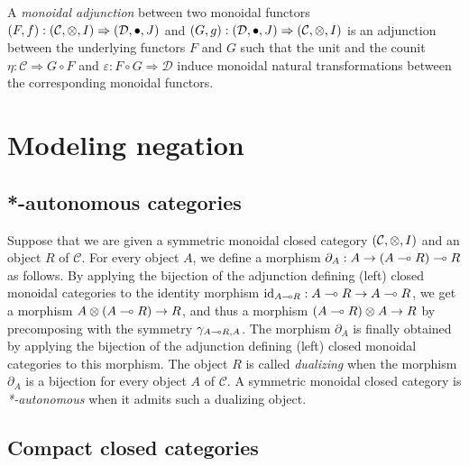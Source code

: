 \begin{definition}
A \emph{monoidal adjunction} between two monoidal functors
$(F,f):(\mathcal{C},\otimes,I)\Rightarrow(\mathcal{D},\bullet,J)$
and
$(G,g):(\mathcal{D},\bullet,J)\Rightarrow(\mathcal{C},\otimes,I)$
is an adjunction between the underlying functors $F$ and $G$ such that the unit and the counit
$\eta:\mathcal{C}\Rightarrow G\circ F$ and $\varepsilon:F\circ G\Rightarrow\mathcal{D}$
induce monoidal natural transformations between the corresponding monoidal functors.
\end{definition}


\section{Modeling negation}\label{modeling-negation}

\subsection{*-autonomous categories}\label{autonomous-categories}

\begin{definition}
Suppose that we are given a symmetric monoidal closed category $(\mathcal{C},\otimes,I)$ and an object $R$ of $\mathcal{C}$. For every object $A$, we define a morphism $\partial_{A}:A\to(A\multimap R)\multimap R$ as follows. By applying the bijection of the adjunction defining (left) closed monoidal categories to the identity morphism $\mathrm{id}_{A\multimap R}:A\multimap R \to A\multimap R$, we get a morphism $A\otimes (A\multimap R)\to R$, and thus a morphism $(A\multimap R)\otimes A\to R$ by precomposing with the symmetry $\gamma_{A\multimap R,A}$. The morphism $\partial_A$ is finally obtained by applying the bijection of the adjunction defining (left) closed monoidal categories to this morphism. The object $R$ is called \emph{dualizing} when the morphism $\partial_A$ is a bijection for every object $A$ of $\mathcal{C}$. A symmetric monoidal closed category is \emph{*-autonomous} when it admits such a dualizing object.
\end{definition}

\subsection{Compact closed categories}\label{compact-closed-categories}

